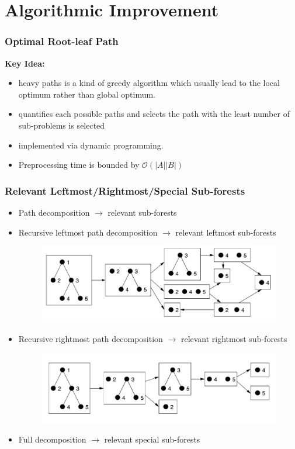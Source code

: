 \documentclass{beamer}
\begin{document}
\section{Algorithmic Improvement}
\begin{frame}
\frametitle{Optimal Root-leaf Path}
\textbf{Key Idea:}
\begin{itemize}
\item heavy paths is a kind of greedy algorithm which usually lead to the local optimum rather than global optimum.
\item quantifies each possible paths and selects the path with the least number of sub-problems is selected
\item implemented via dynamic programming.
\item Preprocessing time  is bounded by $\mathcal{O}(\left\vert A \right\vert \left\vert B \right\vert)$
\end{itemize}
\end{frame}
\begin{frame}
\frametitle{Relevant Leftmost/Rightmost/Special Sub-forests}
\begin{itemize}
\item Path decomposition $\to$ relevant sub-forests %
\item Recursive leftmost path decomposition $\to$ relevant leftmost sub-forests %
\begin{figure}
	\includegraphics[width=0.5\linewidth]{LeftmostPathDecomposition}
	\centering
\end{figure}
\item Recursive rightmost path decomposition $\to$ relevant rightmost sub-forests %
\begin{figure}
	\includegraphics[width=0.5\linewidth]{RightmostPathDecomposition}
	\centering
\end{figure}
\item Full decomposition $\to$ relevant special sub-forests %
\end{itemize}
\end{frame}
\end{document}
